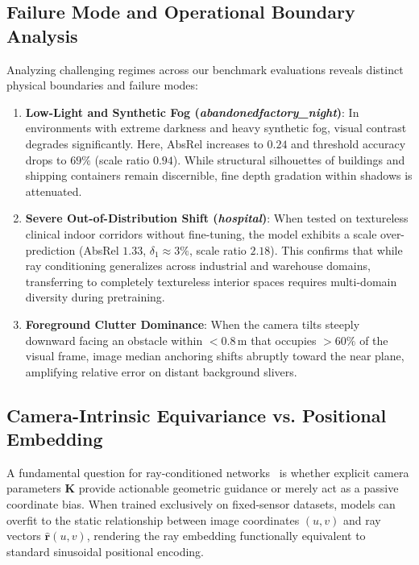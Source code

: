\subsection{Failure Mode and Operational Boundary Analysis}
Analyzing challenging regimes across our benchmark evaluations reveals distinct physical boundaries and failure modes:
\begin{enumerate}
    \item \textbf{Low-Light and Synthetic Fog (\textit{abandonedfactory\_night})}: In environments with extreme darkness and heavy synthetic fog, visual contrast degrades significantly. Here, AbsRel increases to $0.24$ and threshold accuracy drops to $69\%$ (scale ratio $0.94$). While structural silhouettes of buildings and shipping containers remain discernible, fine depth gradation within shadows is attenuated.
    \item \textbf{Severe Out-of-Distribution Shift (\textit{hospital})}: When tested on textureless clinical indoor corridors without fine-tuning, the model exhibits a scale over-prediction (AbsRel $1.33$, $\delta_1 \approx 3\%$, scale ratio $2.18$). This confirms that while ray conditioning generalizes across industrial and warehouse domains, transferring to completely textureless interior spaces requires multi-domain diversity during pretraining.
    \item \textbf{Foreground Clutter Dominance}: When the camera tilts steeply downward facing an obstacle within $<0.8$\,m that occupies $>60\%$ of the visual frame, image median anchoring shifts abruptly toward the near plane, amplifying relative error on distant background slivers.
\end{enumerate}

\subsection{Camera-Intrinsic Equivariance vs. Positional Embedding}
\label{sec:fov_discussion}
A fundamental question for ray-conditioned networks~\cite{facil2019camconvs,yin2023metric3d,piccinelli2024unidepth} is whether explicit camera parameters $\mathbf{K}$ provide actionable geometric guidance or merely act as a passive coordinate bias. When trained exclusively on fixed-sensor datasets, models can overfit to the static relationship between image coordinates $(u, v)$ and ray vectors $\hat{\mathbf{r}}(u, v)$, rendering the ray embedding functionally equivalent to standard sinusoidal positional encoding. 


